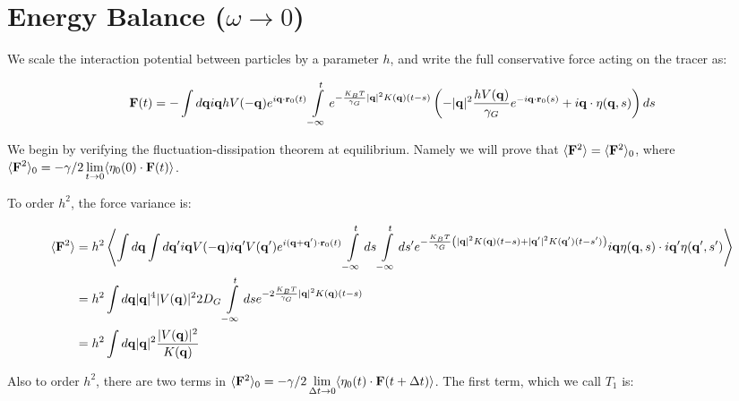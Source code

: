 \documentclass[amsmath,preprintnumbers,10pt,article,notitlepage]{revtex4-1}
\begin{document}
\section{Energy Balance ($\omega \rightarrow 0$)}

We scale the interaction potential between particles by a parameter $h$, and write the full conservative force acting on the tracer as:

\begin{equation}
{\bf F}(t) = -\int d{\bf q} i{\bf q} h V(-{\bf q}) e^{i{\bf q} \cdot {\bf r}_0(t)} \int\limits_{-\infty}^t e^{-\frac{K_BT}{\gamma_G} |{\bf q}|^2 K({\bf q})(t-s)} \left( - |{\bf q}|^2 \dfrac{h V({\bf q})}{\gamma_G} e^{-i{\bf q} \cdot {\bf r}_0(s)} +  i{\bf q} \cdot \eta({\bf q}, s)\right)ds
\label{eq:ConservativeForce}
\end{equation}

We begin by verifying the fluctuation-dissipation theorem at equilibrium. Namely we will prove that $\langle {\bf F}^2 \rangle = \langle {\bf F}^2 \rangle_0 $, where $\displaystyle {\langle {\bf F}^2 \rangle_0 = - \gamma/2 \lim_{t\to 0} \langle \eta_0(0) \cdot {\bf F}(t) \rangle}$.

To order $h^2$, the force variance is:

\begin{align}
\langle {\bf F}^2 \rangle & =  h^2 \left \langle \int d{\bf q} \int  d{\bf q}' i{\bf q}  V(-{\bf q}) i{\bf q}' V({\bf q}') e^{i({\bf q} +{\bf q}') \cdot {\bf r}_0(t)} \int\limits_{-\infty}^t ds \int\limits_{-\infty}^t ds' e^{-\frac{K_BT}{\gamma_G}\left(|{\bf q}|^2 K({\bf q})(t-s)+|{\bf q}'|^2 K({\bf q}')(t-s')\right)} i{\bf q} \eta({\bf q}, s) \cdot  i{\bf q}' \eta({\bf q}', s')  \right \rangle \\
& = h^2 \int d{\bf q} |{\bf q}|^4  |V({\bf q})|^2 2D_G \int\limits_{-\infty}^t ds e^{-2\frac{K_BT}{\gamma_G} |{\bf q}|^2 K({\bf q})(t-s)}  \\
& = h^2 \int d{\bf q} |{\bf q}|^2 \frac{ |V({\bf q})|^2}{K({\bf q})} 
\label{eq:ForceVarianceEquil}
\end{align}

Also to order $h^2$, there are two terms in $\langle {\bf F}^2 \rangle_0 = -\gamma/2  \displaystyle  \lim_{\Delta t \to 0} \langle \eta_0(t) \cdot {\bf F}(t+\Delta t) \rangle$. The first term, which we call $T_1$ is:
\end{document}
